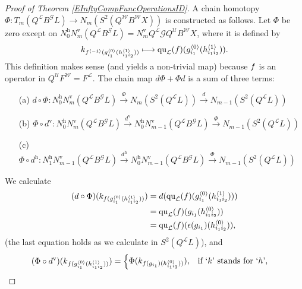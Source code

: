 \documentclass[11pt]{amsart} \renewcommand{\baselinestretch}{1.2}
\theoremstyle{plain}
\numberwithin{equation}{section} %
\theoremstyle{plain}
\numberwithin{equation}{chapter} %
\renewcommand{\to}{\longrightarrow}
\newcommand{\squishlist}{
}
\newcommand{\scrG}{\mathscr{G}}
\newcommand{\calU}{\mathcal{U}}
\newcommand{\calL}{\mathcal{L}}
\newcommand{\calw}{\mathcal{W}}
\newcommand{\call}{\mathcal{L}}
\newcommand{\BSW}{{\scrG}}
\newcommand{\BSWres}{B^\BSW}%
\newcommand{\quadratic}{\mathrm{qu}}
\newcommand{\uver}{^\mathrm{v}}
\newcommand{\uhor}{^\mathrm{h}}
\renewcommand{\mapsto}{\longmapsto}
\begin{document}
\begin{Operations in composite functor spectral sequences}
\begin{proof}[Proof of Theorem \ref{EInftyCompFuncOperationsID}]
A chain homotopy $\Phi:T_m(Q^{\calL}\BSWres L)\to N_m(S^2(Q^{\calw}B^{\calw}X))$ is constructed as follows. Let $\Phi$ be zero except on 
$N\uhor_0N\uver_m (Q^{\call}\BSWres L)=N\uver_mQ^{\calL}\BSW Q^{\calU}B^{\calw}X$,
where it is defined by
\[\smash{k_{f^{\langle -1\rangle}(g^{\smash{\langle} 0\smash{\rangle}}_{i_1}(h^{\smash{\langle} 1\smash{\rangle}}_{i_1i_2}))}}\mapsto {\quadratic_\call}(f)(g^{\smash{\langle} 0\smash{\rangle}}_{i_1}(h^{\smash{\langle} 1\smash{\rangle}}_{i_1i_2})).\]
This definition makes sense (and yields a non-trivial map) because $f\relax $ is an operator in $Q^{\calU}F^{\calw}=F^{\calL}$.
The chain map $d\Phi+\Phi d$ is a sum of three terms:
\begin{enumerate}\squishlist
\item[(a)] $d\circ\Phi:N\uhor_0N\uver_m (Q^{\call}\BSWres L)\overset{\Phi}{\to} N_m(S^2(Q^{\call}L))\overset{d}{\to} N_{m-1}(S^2(Q^{\call}L))$ 
\item[(b)] $\Phi\circ d\uver:N\uhor_0N\uver_{m} (Q^{\call}\BSWres L)\overset{d\uver}{\to} N\uhor_0N\uver_{m-1}(Q^{\call}\BSWres L)\overset{\Phi}{\to} N_{m-1}(S^2(Q^{\call}L))$
\item[(c)] $\Phi\circ d\uhor:N\uhor_1N\uver_{m-1}(Q^{\call}\BSWres L)\overset{d\uhor}{\to} N\uhor_0N\uver_{m-1}(Q^{\call}\BSWres L)\overset{\Phi}{\to} N_{m-1}(S^2(Q^{\call}L))$
\end{enumerate}
We calculate
\begin{alignat*}{2}
(d\circ\Phi)(k_{f\relax (g^{\smash{\langle} 0\smash{\rangle}}_{i_1}(h^{\smash{\langle} 1\smash{\rangle}}_{i_1i_2}))})&=d( {\quadratic_\call}(f)(g^{\smash{\langle} 0\smash{\rangle}}_{i_1}(h^{\smash{\langle} 1\smash{\rangle}}_{i_1i_2})))\\
&={\quadratic_\call}(f)(g\relax _{i_1}(h^{\smash{\langle} 0\smash{\rangle}}_{i_1i_2}))\\
&={\quadratic_\call}(f)(\epsilon(g\relax _{i_1})(h^{\smash{\langle} 0\smash{\rangle}}_{i_1i_2})),
\end{alignat*}
(the last equation holds as we calculate in $S^2(Q^{\call}L)$), and 
\begin{alignat*}{2}
(\Phi\circ d\uver)(k_{f\relax (g^{\smash{\langle} 0\smash{\rangle}}_{i_1}(h^{\smash{\langle} 1\smash{\rangle}}_{i_1i_2}))})&=\begin{cases}
\Phi( k_{f\relax (g\relax _{i_1})(h^{\smash{\langle} 0\smash{\rangle}}_{i_1i_2}))}),&\textup{if `$k$' stands for `$h$'},\\

\end{cases}
\end{alignat*}
\end{proof}
\end{Operations in composite functor spectral sequences}
\end{document}
